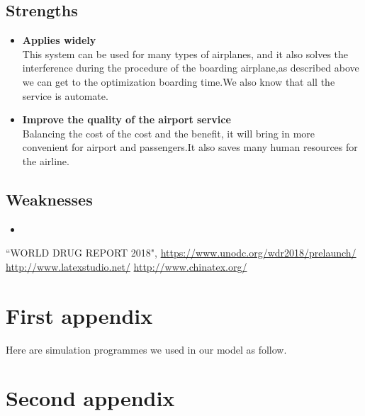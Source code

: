 \documentclass{mcmthesis}
\begin{document}
\subsection{Strengths}
\begin{itemize}
	\item \textbf{Applies widely}\\
	This  system can be used for many types of airplanes, and it also
	solves the interference during  the procedure of the boarding
	airplane,as described above we can get to the  optimization
	boarding time.We also know that all the service is automate.
	\item \textbf{Improve the quality of the airport service}\\
	Balancing the cost of the cost and the benefit, it will bring in
	more convenient  for airport and passengers.It also saves many
	human resources for the airline.
\end{itemize}

\subsection{Weaknesses}
\begin{itemize}
	\item
\end{itemize}

\begin{thebibliography}{99}
	 ``WORLD DRUG REPORT 2018", \url{https://www.unodc.org/wdr2018/prelaunch/}
	\url{http://www.latexstudio.net/}
	\url{http://www.chinatex.org/}
\end{thebibliography}


\begin{appendices}
	
	\section{First appendix}
	
	\lipsum[13]
	
	Here are simulation programmes we used in our model as follow.\\
	
	
	\section{Second appendix}
	
	
	
\end{appendices}
	
	
\end{document}
